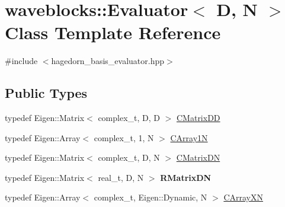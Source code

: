 \hypertarget{classwaveblocks_1_1_evaluator}{}\section{waveblocks\+:\+:Evaluator$<$ D, N $>$ Class Template Reference}
\label{classwaveblocks_1_1_evaluator}


{\ttfamily \#include $<$hagedorn\+\_\+basis\+\_\+evaluator.\+hpp$>$}

\subsection*{Public Types}
\begin{DoxyCompactItemize}
\item 
typedef Eigen\+::\+Matrix$<$ complex\+\_\+t, D, D $>$ \hyperlink{classwaveblocks_1_1_evaluator_a09bb8abec377b4651699c52d02447ad5}{C\+Matrix\+D\+D}
\item 
typedef Eigen\+::\+Array$<$ complex\+\_\+t, 1, N $>$ \hyperlink{classwaveblocks_1_1_evaluator_a49231d0afba65ca701dfdfb9f3c44c14}{C\+Array1\+N}
\item 
typedef Eigen\+::\+Matrix$<$ complex\+\_\+t, D, N $>$ \hyperlink{classwaveblocks_1_1_evaluator_ac9f759ecd07665903ed76d82ac68dc9a}{C\+Matrix\+D\+N}
\item 
\hypertarget{classwaveblocks_1_1_evaluator_aca0e8511e161fc288509f5cf7eeab0af}{}typedef Eigen\+::\+Matrix$<$ real\+\_\+t, D, N $>$ {\bfseries R\+Matrix\+D\+N}\label{classwaveblocks_1_1_evaluator_aca0e8511e161fc288509f5cf7eeab0af}

\item 
typedef Eigen\+::\+Array$<$ complex\+\_\+t, Eigen\+::\+Dynamic, N $>$ \hyperlink{classwaveblocks_1_1_evaluator_ae67334d6256ba6054f452a15d36c4941}{C\+Array\+X\+N}
\end{DoxyCompactItemize}
